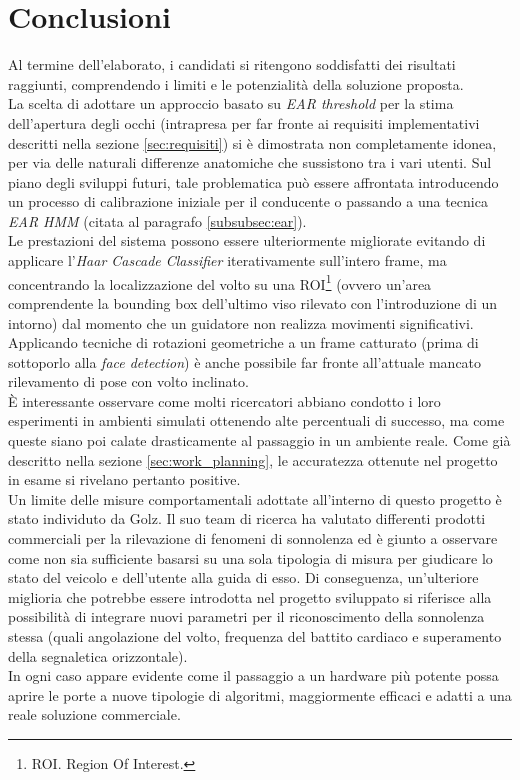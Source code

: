 \documentclass[12pt]{article}
\begin{document}
\section{Conclusioni}
Al termine dell'elaborato, i candidati si ritengono soddisfatti dei risultati raggiunti, comprendendo i limiti e le potenzialità della soluzione proposta.\\
La scelta di adottare un approccio basato su \textit{EAR threshold} per la stima dell'apertura degli occhi (intrapresa per far fronte ai requisiti implementativi descritti nella sezione \ref{sec:requisiti}) si è dimostrata non completamente idonea, per via delle naturali differenze anatomiche che sussistono tra i vari utenti. Sul piano degli sviluppi futuri, tale problematica può essere affrontata introducendo un processo di calibrazione iniziale per il conducente o passando a una tecnica \textit{EAR HMM} (citata al paragrafo \ref{subsubsec:ear}).\\
Le prestazioni del sistema possono essere ulteriormente migliorate evitando di applicare l'\textit{Haar Cascade Classifier} iterativamente sull'intero frame, ma concentrando la localizzazione del volto su una ROI\footnote{ROI. Region Of Interest.} (ovvero un'area comprendente la bounding box dell'ultimo viso rilevato con l'introduzione di un intorno) dal momento che un guidatore non realizza movimenti significativi.\\
Applicando tecniche di rotazioni geometriche a un frame catturato (prima di sottoporlo alla \textit{face detection}) è anche possibile far fronte all'attuale mancato rilevamento di pose con volto inclinato\cite{FaceRotation}.\\
È interessante osservare come molti ricercatori abbiano condotto i loro esperimenti in ambienti simulati ottenendo alte percentuali di successo, ma come queste siano poi calate drasticamente al passaggio in un ambiente reale. Come già descritto nella sezione \ref{sec:work_planning}, le accuratezza ottenute nel progetto in esame si rivelano pertanto positive.\\
Un limite delle misure comportamentali adottate all'interno di questo progetto è stato individuto da Golz. Il suo team di ricerca ha valutato differenti prodotti commerciali per la rilevazione di fenomeni di sonnolenza ed è giunto a osservare come non sia sufficiente basarsi su una sola tipologia di misura per giudicare lo stato del veicolo e dell'utente alla guida di esso\cite{Golz}. Di conseguenza, un'ulteriore miglioria che potrebbe essere introdotta nel progetto sviluppato si riferisce alla possibilità di integrare nuovi parametri per il riconoscimento della sonnolenza stessa (quali angolazione del volto, frequenza del battito cardiaco e superamento della segnaletica orizzontale).\\
In ogni caso appare evidente come il passaggio a un hardware più potente possa aprire le porte a nuove tipologie di algoritmi, maggiormente efficaci e adatti a una reale soluzione commerciale.
\end{document}

